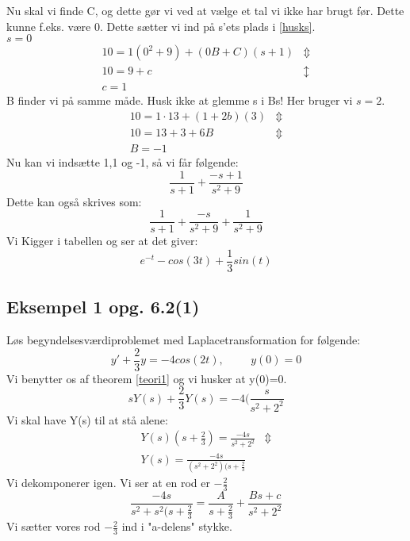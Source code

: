 \documentclass[11pt,fleqn]{book} %
\begin{document}
Nu skal vi finde C, og dette gør vi ved at vælge et tal vi ikke har brugt før. Dette kunne f.eks. være 0. Dette sætter vi ind på s'ets plads i \ref{husks}.\\
$s=0$
\begin{equation}
\begin{split}
10=1(0^2+9)+(0B+C)(s+1) & \Updownarrow \\
10= 9+c & \updownarrow \\
c=1
\end{split}
\end{equation}
B finder vi på samme måde. Husk ikke at glemme s i Bs! Her bruger vi $s=2$.
\begin{equation}
\begin{split}
10=1 \cdot 13 + (1+2b)(3) & \Updownarrow \\
10 = 13 +3 +6B & \Updownarrow \\
B=-1
\end{split}
\end{equation}
Nu kan vi indsætte 1,1 og -1, så vi får følgende:
\begin{equation}
\frac{1}{s+1}+\frac{-s+1}{s^2+9}
\end{equation}
Dette kan også skrives som:
\begin{equation}
\frac{1}{s+1}+\frac{-s}{s^2+9}+\frac{1}{s^2+9}
\end{equation}
Vi Kigger i tabellen og ser at det giver:
\begin{equation}
e^{-t}-cos(3t)+\frac{1}{3}sin(t)
\end{equation}

\subsection{Eksempel 1 opg. 6.2(1)}
Løs begyndelsesværdiproblemet  med Laplacetransformation for følgende:
\begin{equation}
y'+\frac{2}{3}y=-4cos(2t), \hspace{1cm} y(0)=0
\end{equation}
Vi benytter os af theorem \ref{teori1} og vi husker at y(0)=0.
\begin{equation}
sY(s)+\frac{2}{3}Y(s)=-4(\frac{s}{s^2+2^2}
\end{equation}
Vi skal have Y(s) til at stå alene:
\begin{equation}
\begin{split}
Y(s)(s+\frac{2}{3})=\frac{-4s}{s^2+2^2} & \Updownarrow \\
Y(s)=\frac{-4s}{(s^2+2^2)(s+\frac{2}{3}}
\end{split}
\end{equation}
Vi dekomponerer igen. Vi ser at en rod er $-\frac{2}{3}$
\begin{equation}
\frac{-4s}{s^2+s^2(s+\frac{2}{3}}=\frac{A}{s+\frac{2}{3}}+\frac{Bs+c}{s^2+2^2}
\end{equation}
Vi sætter vores rod $-\frac{2}{3}$ ind i "a-delens" stykke.
\end{document}
